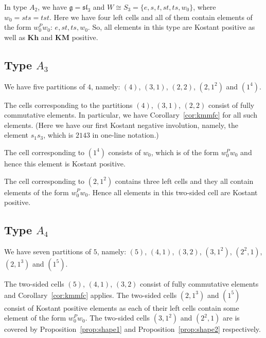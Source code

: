 \documentclass[a4paper]{amsart}
\begin{document}
In type $A_2$, we have $\mathfrak{g}=\mathfrak{sl}_3$
and $W\cong S_3=\{e,s,t,st,ts,w_0\}$, where $w_0=sts=tst$. 
Here we have four left cells and all of them contain
elements of the form $w_0^Pw_0$: $e,st,ts,w_0$. 
So, all elements in this type are Kostant positive
as well as $\mathbf{Kh}$ and $\mathbf{KM}$ positive.

\subsection{Type $A_3$}\label{s5.3}

We have five partitions of $4$, namely:
$(4)$, $(3,1)$, $(2,2)$, $(2,1^2)$ and $(1^4)$.

The cells corresponding to the partitions 
$(4)$, $(3,1)$, $(2,2)$ consist of fully commutative
elements. In particular, we have Corollary~\ref{cor:kmmfc}
for all such elements. (Here we have our first Kostant negative involution, namely, the element  $s_1s_3$, which is $2143$ in one-line notation.)

The cell corresponding to $(1^4)$ consists of $w_0$,
which is of the form $w_0^Pw_0$ and hence 
this element is Kostant positive.

The cell corresponding to $(2,1^2)$ contains three
left cells and they all contain elements of the form 
$w_0^Pw_0$. Hence all elements in this two-sided cell
are Kostant positive.






\subsection{Type $A_4$}\label{s5.4}

We have seven partitions of $5$, namely:
$(5)$, $(4,1)$, $(3,2)$, $(3,1^2)$, $(2^2,1)$, $(2,1^3)$ and $(1^5)$.

The two-sided cells $(5)$, $(4,1)$, $(3,2)$ consist of 
fully commutative elements and Corollary~\ref{cor:kmmfc} applies. %
The two-sided cells 
$(2,1^3)$ and $(1^5)$ consist of Kostant positive elements
as each of their left cells contain some element of the form $w_0^Pw_0$.
The two-sided cells $(3,1^2)$ and $(2^2,1)$ are is covered by Proposition~\ref{prop:shape1} and Proposition~\ref{prop:shape2} respectively.
\end{document}
